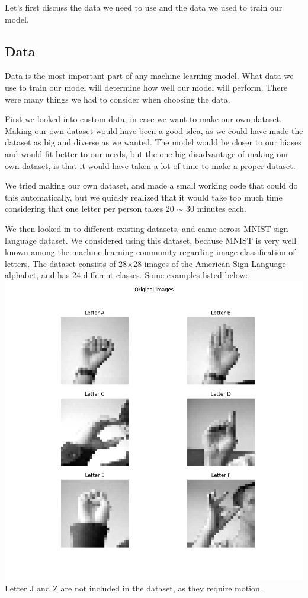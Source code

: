 \documentclass[../paper.tex]{subfiles}
\begin{document}
    Let's first discuss the data we need to use and the data we used to train our model.
    \subsection{Data}
    Data is the most important part of any machine learning model.
    What data we use to train our model will determine how well our model will perform. 
    There were many things we had to consider when choosing the data. 

    First we looked into custom data, in case we want to make our own dataset. 
    Making our own dataset would have been a good idea, 
    as we could have made the dataset as big and diverse as we wanted.
    The model would be closer to our biases and would fit better to our needs, 
    but the one big disadvantage of making our own dataset, is that it would have taken a lot of time to make a proper dataset. 

    We tried making our own dataset, and made a small working code that could do this automatically, 
    but we quickly realized that it would take too much time considering that one letter per person takes 20 $\sim$ 30 minutes each. 

    We then looked in to different existing datasets, and came across MNIST sign language dataset\cite{d0}. 
    We considered using this dataset, because MNIST is very well known among the machine learning community regarding image classification of letters\cite{o0}.
    The dataset consists of 28$\times$28 images of the American Sign Language alphabet, 
    and has 24 different classes. 
    Some examples listed below:
    \includegraphics[width=\linewidth]{letters_grid_6} 
    Letter J and Z are not included in the dataset, as they require motion. 
\end{document}
